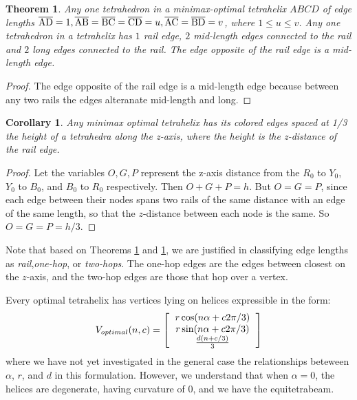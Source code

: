 \documentclass[11pt]{article}
\newtheorem{theorem}{Theorem}
\newtheorem{corollary}{Corollary}
\begin{document}
  
\begin{theorem}
  \label{tetrahelixoptimality}
  Any one tetrahedron in a minimax-optimal tetrahelix $ABCD$ of edge lengths $\overline{\rm AD} = 1, \overline{\rm AB} = \overline{\rm BC} = \overline{\rm CD} = u , \overline{\rm AC} = \overline{\rm BD} = v$, where $1 \leq u \leq v$.
  Any one tetrahedron in a tetrahelix has $1$ rail edge, $2$ mid-length edges connected to the rail and $2$ long edges connected to the rail.
  The edge opposite of the rail edge is a mid-length edge.
\end{theorem}

\begin{proof}
The edge opposite of the rail edge is a mid-length edge because between any two rails the edges alteranate mid-length and long.
\end{proof}

\begin{corollary}
  \label{eventhirds}
  Any minimax optimal tetrahelix has its colored edges spaced at 1/3 the height of
  a tetrahedra along the z-axis, where the height is the z-distance of the rail edge.
  \end{corollary}

\begin{proof}
  Let the variables $O,G,P$ represent the z-axis distance from the
  $R_0$ to $Y_0$, $Y_0$ to $B_0$, and
  $B_0$ to $R_0$ respectively. Then $O+G+P = h$. But $O=G=P$, since each edge between
  their nodes spans two rails of the same distance with an edge of the same length,
  so that the $z$-distance between each node is the same. So $O=G=P=h/3$.
\end{proof}

Note that based on Theorems \ref{tetrahelixoptimality} and \ref{eventhirds}, we are justified in classifying edge lengths as \emph{rail},\emph{one-hop}, or
\emph{two-hops}. The one-hop edges are the edges between closest on the $z$-axis, and the two-hop edges are those that hop over a vertex.

Every optimal tetrahelix has vertices lying on helices expressible in the form:
\[
V_{optimal}(n,c) =
\left [
  \begin{tabular}{c}
   $ r \cos(n \alpha +  c 2 \pi /3)$\\
   $ r \sin(n \alpha +  c 2 \pi /3) $\\
   $ \frac{d(n +c / 3)}{3}   $
  \end{tabular}
\right ]
\]
where we have not yet investigated in the general case the relationships beteween $\alpha$, $r$, and $d$ in this formulation.
However, we understand that when $\alpha = 0$, the helices are degenerate, having curvature of $0$, and
we have the equitetrabeam.
\end{document}
